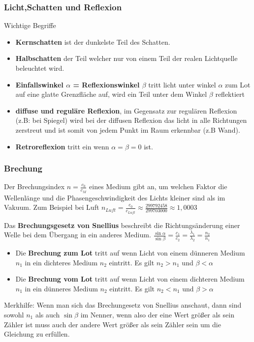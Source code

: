 \documentclass[../document.tex]{subfiles}
\begin{document}
\subsubsection {Licht,Schatten und Reflexion}
Wichtige Begriffe
\begin{itemize} 
	\item \textbf{Kernschatten} ist der dunkelste Teil des Schatten.
	\item \textbf{Halbschatten} der Teil welcher nur von einem Teil der realen Lichtquelle beleuchtet wird.
	\item \textbf{Einfallswinkel $\alpha$ = Reflexionswinkel $\beta$} tritt licht unter winkel $\alpha$ zum Lot auf eine glatte Grenzfläche auf, wird ein Teil unter dem Winkel $\beta$ reflektiert
	\item \textbf{diffuse und reguläre Reflexion}, im Gegensatz zur regulären Reflexion (z.B: bei Spiegel) wird bei der diffusen Reflexion das licht in alle Richtungen zerstreut und ist somit von jedem Punkt im Raum erkennbar (z.B Wand).
	\item \textbf{Retroreflexion} tritt ein wenn $\alpha = \beta = 0$ ist.
\end{itemize}

\subsubsection{Brechung}

Der Brechungsindex $n = \frac{c_0}{c_M}$ eines Medium gibt an, um welchen Faktor die Wellenlänge und die Phasengeschwindigkeit des Lichts kleiner sind als im Vakuum. Zum Beispiel bei Luft $n_{Luft} = \frac{c_0}{c_{Luft}} \approx \frac{299792458}{299703000} \approx 1,0003$

Das \textbf{Brechungsgesetz von Snellius} beschreibt die Richtungsänderung einer Welle bei dem Übergang in ein anderes Medium. 
$\frac{\sin\alpha}{\sin\beta} = \frac{c_1}{c_2} = \frac{\lambda_1}{\lambda_2} = \frac{n_2}{n_1}$

\begin{itemize}
	\item Die \textbf{Brechung zum Lot} tritt auf wenn Licht von einem dünneren Medium $n_1$ in ein dichteres Medium $n_2$ eintritt. Es gilt $n_2 > n_1$ und $\beta < \alpha$
	\item Die \textbf{Brechung vom Lot} tritt auf wenn Licht von einem dichteren Medium $n_1$ in ein dünneres Medium $n_2$ eintritt. Es gilt $n_2 < n_1$ und $\beta > \alpha$
\end{itemize}
Merkhilfe: Wenn man sich das Brechungesetz von Snellius anschaut, dann sind sowohl $n_1$ als auch $\sin \beta$ im Nenner, wenn also der eine Wert größer als sein Zähler ist muss auch der andere Wert größer als sein Zähler sein um die Gleichung zu erfüllen.
\end{document}
